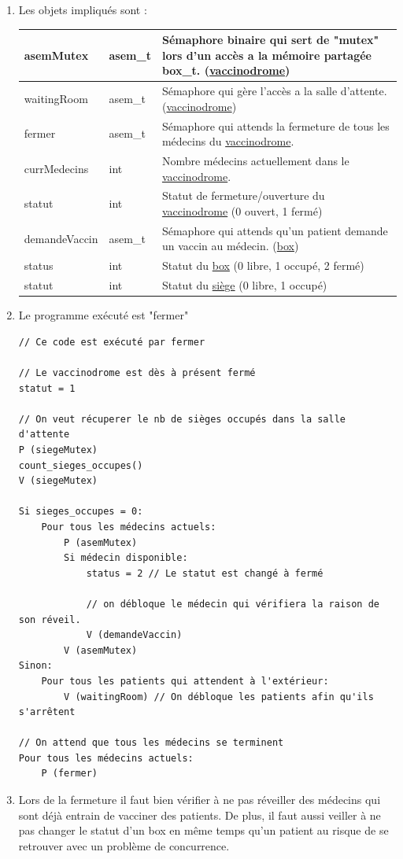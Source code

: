 \documentclass[a4paper]{article}
\begin{document}
  \begin{enumerate}
    \item Les objets impliqués sont :

    \begin{tabularx}{\linewidth}{|l|l|>{\strut}X|}
      \hline%
      asemMutex & asem\_t & Sémaphore binaire qui sert de "mutex" lors d'un accès a la mémoire partagée box\_t. (\underline{vaccinodrome}) \\ \hline%
      waitingRoom & asem\_t & Sémaphore qui gère l'accès a la salle d'attente. (\underline{vaccinodrome}) \\ \hline%
      fermer & asem\_t & Sémaphore qui attends la fermeture de tous les médecins du \underline{vaccinodrome}. \\ \hline%
      currMedecins & int & Nombre médecins actuellement dans le \underline{vaccinodrome}. \\ \hline%
      statut & int & Statut de fermeture/ouverture du \underline{vaccinodrome} (0 ouvert, 1 fermé) \\ \hline%

      demandeVaccin & asem\_t & Sémaphore qui attends qu'un patient demande un vaccin au médecin. (\underline{box}) \\ \hline%
      status & int & Statut du \underline{box} (0 libre, 1 occupé, 2 fermé) \\ \hline%
      statut & int & Statut du \underline{siège} (0 libre, 1 occupé) \\ \hline%
    \end{tabularx}

    \item Le programme exécuté est "fermer"

    \begin{verbatim}
// Ce code est exécuté par fermer

// Le vaccinodrome est dès à présent fermé
statut = 1

// On veut récuperer le nb de sièges occupés dans la salle d'attente
P (siegeMutex)
count_sieges_occupes()
V (siegeMutex)

Si sieges_occupes = 0:
    Pour tous les médecins actuels:
        P (asemMutex)
        Si médecin disponible:
            status = 2 // Le statut est changé à fermé

            // on débloque le médecin qui vérifiera la raison de son réveil.
            V (demandeVaccin)
        V (asemMutex)
Sinon:
    Pour tous les patients qui attendent à l'extérieur:
        V (waitingRoom) // On débloque les patients afin qu'ils s'arrêtent

// On attend que tous les médecins se terminent
Pour tous les médecins actuels:
    P (fermer)

    \end{verbatim}

    \item Lors de la fermeture il faut bien vérifier à ne pas réveiller des médecins qui sont déjà entrain de vacciner des patients. De plus, il faut aussi veiller à ne pas changer le statut d'un box en même temps qu'un patient au risque de se retrouver avec un problème de concurrence.
  \end{enumerate}
  \newpage
\end{document}
